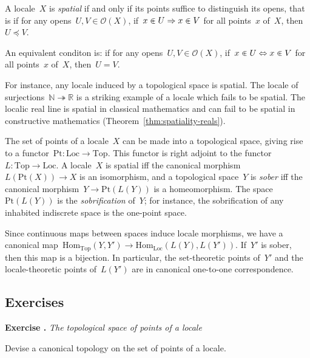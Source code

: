 \documentclass{ws-rv9x6}
\newlength{\exerciseskip}
\newcounter{exercisenr}
\newenvironment{exercise}[1]{
  \refstepcounter{exercisenr}
  \noindent\textbf{Exercise \theexercisenr{}.} \emph{#1} \smallskip\par\noindent%
}{\par\vspace{\exerciseskip}}
\renewcommand{\O}{\mathcal{O}}
\newcommand{\NN}{\mathbb{N}}
\newcommand{\RR}{\mathbb{R}}
\newcommand{\Hom}{\mathrm{Hom}}
\renewcommand{\_}{\mathpunct{.}}
\newcommand{\?}{\,{:}\,}
\newcommand{\Pt}{\mathrm{Pt}}
\newcommand{\Loc}{\mathrm{Loc}}
\newcommand{\Top}{\mathrm{Top}}
\begin{document}
\begin{definition}A locale~$X$ is \emph{spatial} if and only if its points
suffice to distinguish its opens, that is if for any opens~$U, V \in \O(X)$,
if~$x \inplus U \Rightarrow x \inplus V$ for all points~$x$ of~$X$, then~$U
\preceq V$.\end{definition}

An equivalent conditon is: if for any opens~$U, V \in \O(X)$, if~$x \inplus U
\Leftrightarrow x \inplus V$ for all points~$x$ of~$X$, then~$U = V$.

For instance, any locale induced by a topological space is spatial. The locale
of surjections~$\NN \twoheadrightarrow \RR$ is a striking example of a locale which fails to be
spatial. The localic real line is spatial in classical mathematics and can
fail to be spatial in constructive mathematics (Theorem~\ref{thm:spatiality-reals}).

\begin{remark}The set of points of a locale~$X$ can be made into a topological space, giving
rise to a functor~$\Pt : \Loc \to \Top$. This functor is right adjoint
to the functor~$L : \Top \to \Loc$. A locale~$X$ is spatial iff the canonical
morphism~$L(\Pt(X)) \to X$ is an isomorphism, and a topological space~$Y$
is \emph{sober} iff the canonical morphism~$Y \to \Pt(L(Y))$ is a
homeomorphism. The space~$\Pt(L(Y))$ is the \emph{sobrification} of~$Y$; for
instance, the sobrification of any inhabited indiscrete space is the one-point
space.\end{remark}

\begin{remark}\label{rem:sober-embed}
Since continuous maps between spaces induce locale morphisms, we
have a canonical map~$\Hom_\Top(Y,Y') \to \Hom_\Loc(L(Y),L(Y'))$. If~$Y'$ is
sober, then this map is a bijection. In particular, the set-theoretic points
of~$Y'$ and the locale-theoretic points of~$L(Y')$ are in canonical
one-to-one correspondence.
\end{remark}


\subsection{Exercises}

\begin{exercise}{The topological space of points of a locale}%
\label{ex:canonical-topology}%
Devise a canonical topology on the set of points of a locale.
\end{exercise}
\end{document}
